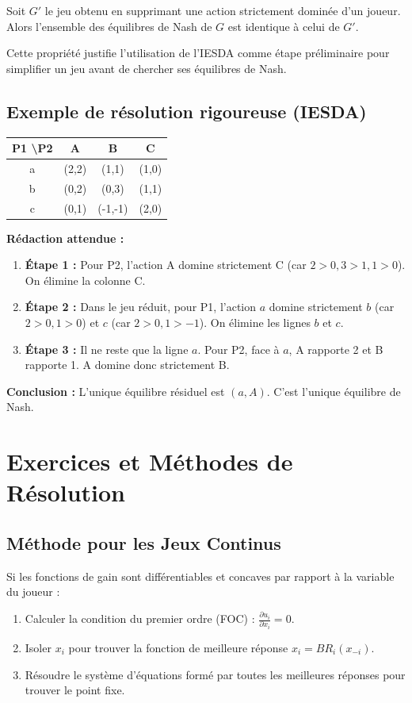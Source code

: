 \begin{proposition}
Soit $G'$ le jeu obtenu en supprimant une action strictement dominée d'un joueur. Alors l'ensemble des équilibres de Nash de $G$ est identique à celui de $G'$.
\end{proposition}
Cette propriété justifie l'utilisation de l'IESDA comme étape préliminaire pour simplifier un jeu avant de chercher ses équilibres de Nash.

\subsection{Exemple de résolution rigoureuse (IESDA)}
\begin{center}
\begin{tabular}{c|c|c|c}
P1 \textbackslash P2 & A & B & C \\ \hline
a & (2,2) & (1,1) & (1,0) \\ \hline
b & (0,2) & (0,3) & (1,1) \\ \hline
c & (0,1) & (-1,-1) & (2,0)
\end{tabular}
\end{center}

\textbf{Rédaction attendue :}
\begin{enumerate}
    \item \textbf{Étape 1 :} Pour P2, l'action A domine strictement C (car $2>0, 3>1, 1>0$). On élimine la colonne C.
    \item \textbf{Étape 2 :} Dans le jeu réduit, pour P1, l'action $a$ domine strictement $b$ (car $2>0, 1>0$) et $c$ (car $2>0, 1>-1$). On élimine les lignes $b$ et $c$.
    \item \textbf{Étape 3 :} Il ne reste que la ligne $a$. Pour P2, face à $a$, A rapporte 2 et B rapporte 1. A domine donc strictement B.
\end{enumerate}
\textbf{Conclusion :} L'unique équilibre résiduel est $(a, A)$. C'est l'unique équilibre de Nash.

\section{Exercices et Méthodes de Résolution}

\subsection{Méthode pour les Jeux Continus}
Si les fonctions de gain sont différentiables et concaves par rapport à la variable du joueur :
\begin{enumerate}
    \item Calculer la condition du premier ordre (FOC) : $\frac{\partial u_i}{\partial x_i} = 0$.
    \item Isoler $x_i$ pour trouver la fonction de meilleure réponse $x_i = BR_i(x_{-i})$.
    \item Résoudre le système d'équations formé par toutes les meilleures réponses pour trouver le point fixe.
\end{enumerate}

